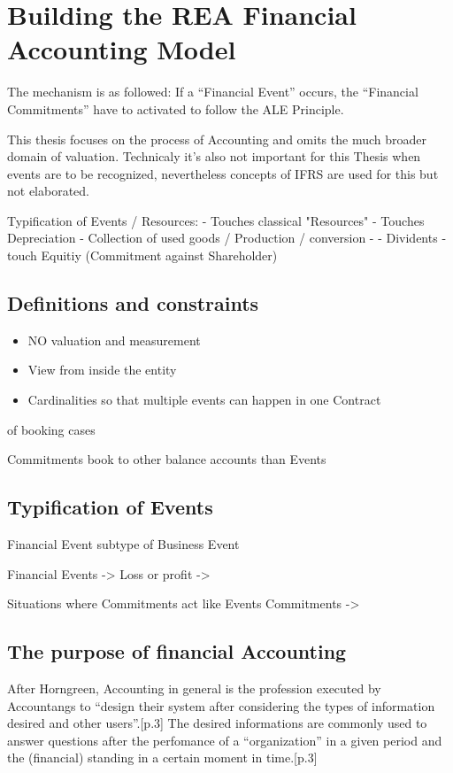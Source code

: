 \chapter{Building the REA Financial Accounting Model}\label{chap:IntroREA}

The mechanism is as followed: If a \enquote{Financial Event} occurs, the \enquote{Financial Commitments} have to activated to follow the ALE Principle.



This thesis focuses on the process of Accounting and omits the much broader domain of valuation.
Technicaly it's also not important for this Thesis when events are to be recognized, nevertheless concepts of IFRS are used for this but not elaborated.


Typification of Events / Resources:
- Touches classical "Resources"
- Touches Depreciation - Collection of used goods / Production / conversion - 
- Dividents - touch Equitiy (Commitment against Shareholder)


\section{Definitions and constraints}
\begin{itemize}
	\item NO valuation and measurement
	\item View from inside the entity
	\item Cardinalities so that multiple events can happen in one Contract
\end{itemize}

\Types of booking cases

Commitments book to other balance accounts than Events


\section{Typification of Events}

Financial Event subtype of Business Event

Financial Events -> Loss or profit -> 


Situations where Commitments act like Events
Commitments -> 





\section{The purpose of financial Accounting}
After Horngreen, Accounting in general is the profession executed by Accountangs to \enquote{design their system after considering the types of information desired and other users}.\cite{horngren1984introduction}[p.3]
The desired informations are commonly used to answer questions after the perfomance of a \enquote{organization} in a given period and the (financial) standing in a certain moment in time.\cite{horngren1984introduction}[p.3]

